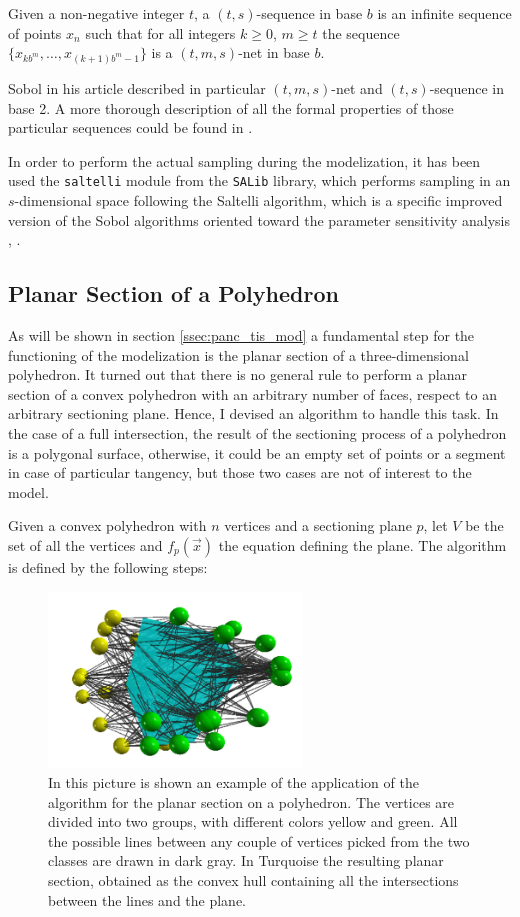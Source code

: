 Given a non-negative integer $t$, a $(t,s)$-sequence in base $b$ is an infinite sequence of points $x_n$ such that for all integers $k \geq 0$, $m \geq t$ the sequence $ \{ x_{kb^m}, \dots, x_{(k+1)b^m-1} \}$ is a $(t,m,s)$-net in base $b$.

Sobol in his article described in particular $(t,m,s)$-net and $(t,s)$-sequence in base 2. A more thorough description of all the formal properties of those particular sequences could be found in \cite{SOBOL1976236}.

In order to perform the actual sampling during the modelization, it has been used the \texttt{saltelli} module from the \texttt{SALib} library, which performs sampling in an $s$-dimensional space following the Saltelli algorithm, which is a specific improved version of the Sobol algorithms oriented toward the parameter sensitivity analysis \cite{SALTELLI2002280}, \cite{SALTELLI2010259}.

\subsection{Planar Section of a Polyhedron} \label{ssec:pol_sec}
As will be shown in section \ref{ssec:panc_tis_mod} a fundamental step for the functioning of the modelization is the planar section of a three-dimensional polyhedron. It turned out that there is no general rule to perform a planar section of a convex polyhedron with an arbitrary number of faces, respect to an arbitrary sectioning plane. Hence, I devised an algorithm to handle this task. In the case of a full intersection, the result of the sectioning process of a polyhedron is a polygonal surface, otherwise, it could be an empty set of points or a segment in case of particular tangency, but those two cases are not of interest to the model.

Given a convex polyhedron with $n$ vertices and a sectioning plane $p$, let $V$ be the set of all the vertices and $f_p(\vec x)$ the equation defining the plane. The algorithm is defined by the following steps:

\begin{figure}
    \centering
    \includegraphics[width = 0.6\textwidth]{images/sec_pol}
    \caption{In this picture is shown an example of the application of the algorithm for the planar section on a polyhedron. The vertices are divided into two groups, with different colors yellow and green. All the possible lines between any couple of vertices picked from the two classes are drawn in dark gray. In Turquoise the resulting planar section, obtained as the convex hull containing all the intersections between the lines and the plane.}
    \label{fig:sec_pol}
\end{figure}

